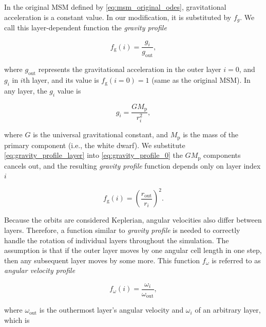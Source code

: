     In the original MSM defined by \eqref{eq:msm_original_odes}, gravitational acceleration is a constant value. In our modification, it is substituted by $f_g$. We call this layer-dependent function the \emph{gravity profile} 

    \begin{equation}
        f_{\mathrm{g}}(i) = \frac{g_i}{g_{\mathrm{out}}},
        \label{eq:gravity_profile_0}
    \end{equation}

    where $g_{\mathrm{out}}$ represents the gravitational acceleration in the outer layer $i=0$, and $g_i$ in $i$th layer, and its value is ${f_{\mathrm{g}}(i=0) = 1}$ (same as the original MSM). In any layer, the $g_i$ value is 

    \begin{equation}
        g_i = \frac{GM_{\mathrm{p}}}{r_i^2},
        \label{eq:gravity_profile_layer}
    \end{equation}

    where $G$ is the universal gravitational constant, and $M_{\mathrm{p}}$ is the mass of the primary component (i.e., the white dwarf). We substitute \eqref{eq:gravity_profile_layer} into \eqref{eq:gravity_profile_0} the $GM_{\mathrm{p}}$ components cancels out, and the resulting \emph{gravity profile} function depends only on layer index $i$

    \begin{equation}
        f_{\mathrm{g}}(i) = \left( \frac{r_{\mathrm{out}}}{r_i} \right)^2.
        \label{eq:gravity_profile_final}
    \end{equation}


    Because the orbits are considered Keplerian, angular velocities also differ between layers. Therefore, a function similar to \emph{gravity profile} is needed to correctly handle the rotation of individual layers throughout the simulation. The assumption is that if the outer layer moves by one angular cell length in one step, then any subsequent layer moves by some more. This function $f_{\omega}$ is referred to as \emph{angular velocity profile}

    \begin{equation}
        f_{\omega}(i) = \frac{\omega_i}{\omega_\mathrm{out}},
        \label{eq:av_profile_0}
    \end{equation}

    where $\omega_{\mathrm{out}}$ is the outhermost layer's angular velocity and $\omega_i$ of an arbitrary layer, which is 

